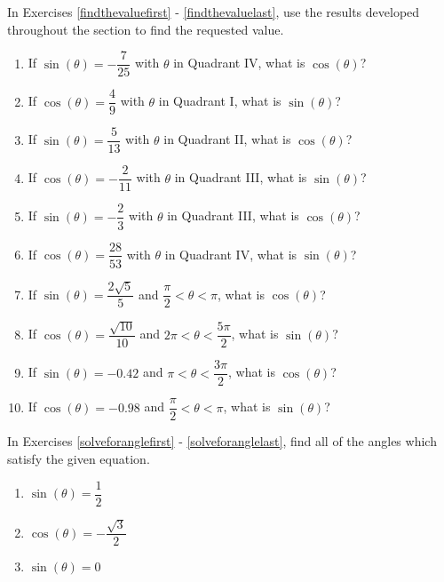 In Exercises \ref{findthevaluefirst} - \ref{findthevaluelast}, use the results developed throughout the section to find the requested value.

\begin{enumerate}

\setcounter{enumi}{\value{HW}}

\item If $\sin(\theta) = -\dfrac{7}{25}$ with $\theta$ in Quadrant IV, what is $\cos(\theta)$? \label{findthevaluefirst}
\item If $\cos(\theta) = \dfrac{4}{9}$ with $\theta$ in Quadrant I, what is $\sin(\theta)$?
\item If $\sin(\theta) = \dfrac{5}{13}$ with $\theta$ in Quadrant II, what is $\cos(\theta)$?
\item If $\cos(\theta) = -\dfrac{2}{11}$ with $\theta$ in Quadrant III, what is $\sin(\theta)$?
\item If $\sin(\theta) = -\dfrac{2}{3}$ with $\theta$ in Quadrant III, what is $\cos(\theta)$?
\item If $\cos(\theta) = \dfrac{28}{53}$ with $\theta$ in Quadrant IV, what is $\sin(\theta)$?
\item  If $\sin(\theta) = \dfrac{2\sqrt{5}}{5}$ and $\dfrac{\pi}{2} < \theta < \pi$, what is $\cos(\theta)$?
\item  If $\cos(\theta) = \dfrac{\sqrt{10}}{10}$ and $2\pi < \theta < \dfrac{5\pi}{2}$, what is $\sin(\theta)$?
\item  If $\sin(\theta) = -0.42$ and $\pi < \theta < \dfrac{3\pi}{2}$, what is  $\cos(\theta)$?
\item  If $\cos(\theta) = -0.98$ and $\dfrac{\pi}{2} < \theta < \pi$, what is $\sin(\theta)$? \label{findthevaluelast}

\setcounter{HW}{\value{enumi}}

\end{enumerate}

\pagebreak

In Exercises \ref{solveforanglefirst} - \ref{solveforanglelast}, find all of the angles which satisfy the given equation.

\begin{multicols}{3}

\begin{enumerate}

\setcounter{enumi}{\value{HW}}

\item $\sin(\theta) = \dfrac{1}{2}$  \label{solveforanglefirst}
\item $\cos(\theta) = -\dfrac{\sqrt{3}}{2}$
\item $\sin(\theta) = 0$ 

\setcounter{HW}{\value{enumi}}

\end{enumerate}

\end{multicols}

